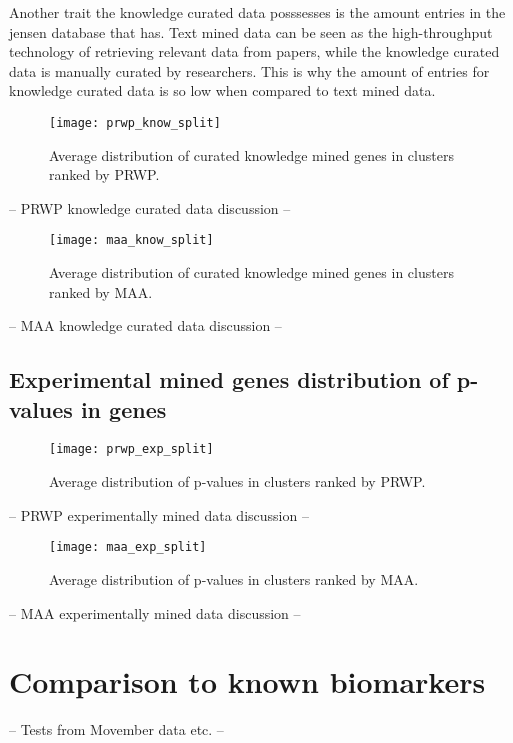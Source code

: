 Another trait the knowledge curated data posssesses is the amount entries in the
\gls{jensen} database that has. Text mined data can be seen as the
high-throughput technology of retrieving relevant data from papers, while the
knowledge curated data is manually curated by researchers. This is why the
amount of entries for knowledge curated data is so low when compared to text
mined data.

\begin{sidewaysfigure}
    \label{fig:know-iref-prwp}
    \texttt{[image: prwp\_know\_split]}
    \caption{Average distribution of curated knowledge mined genes in clusters
    ranked by PRWP.}
\end{sidewaysfigure}
-- PRWP knowledge curated data discussion --

\begin{sidewaysfigure}
    \label{fig:know-iref-maa}
    \texttt{[image: maa\_know\_split]}
    \caption{Average distribution of curated knowledge mined genes in clusters
    ranked by MAA.}
\end{sidewaysfigure}
-- MAA knowledge curated data discussion --

\subsection{Experimental mined genes distribution of p-values in genes}
\begin{sidewaysfigure}
    \label{fig:exp-iref-prwp}
    \texttt{[image: prwp\_exp\_split]}
    \caption{Average distribution of p-values in clusters ranked by PRWP.}
\end{sidewaysfigure}
-- PRWP experimentally mined data discussion --

\begin{sidewaysfigure}
    \label{fig:exp-iref-maa}
    \texttt{[image: maa\_exp\_split]}
    \caption{Average distribution of p-values in clusters ranked by MAA.}
\end{sidewaysfigure}
-- MAA experimentally mined data discussion --


\section{Comparison to known biomarkers}
-- Tests from Movember data etc. --

